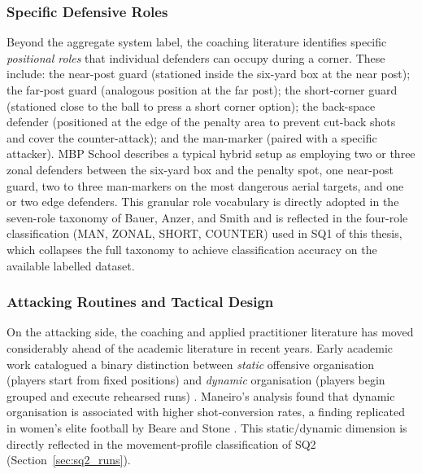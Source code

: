 \subsubsection{Specific Defensive Roles}

Beyond the aggregate system label, the coaching literature identifies specific
\emph{positional roles} that individual defenders can occupy during a corner.
These include: the near-post guard (stationed inside the six-yard box at the
near post); the far-post guard (analogous position at the far post); the
short-corner guard (stationed close to the ball to press a short corner option);
the back-space defender (positioned at the edge of the penalty area to prevent
cut-back shots and cover the counter-attack); and the man-marker (paired with a
specific attacker). MBP School \cite{MBP2025} describes a typical hybrid
setup as employing two or three zonal defenders between the six-yard box and the
penalty spot, one near-post guard, two to three man-markers on the most dangerous
aerial targets, and one or two edge defenders. This granular role vocabulary is
directly adopted in the seven-role taxonomy of Bauer, Anzer, and Smith
\cite{Bauer2022} and is reflected in the four-role classification
(MAN, ZONAL, SHORT, COUNTER) used in SQ1 of this thesis, which collapses the
full taxonomy to achieve classification accuracy on the available labelled
dataset.

\subsubsection{Attacking Routines and Tactical Design}

On the attacking side, the coaching and applied practitioner literature has
moved considerably ahead of the academic literature in recent years. Early
academic work catalogued a binary distinction between \emph{static} offensive
organisation (players start from fixed positions) and \emph{dynamic} organisation
(players begin grouped and execute rehearsed runs) \citep{Maneiro2014}. Maneiro's
analysis found that dynamic organisation is associated with higher shot-conversion
rates, a finding replicated in women's elite football by Beare and Stone
\cite{BeareStone2019}. This static/dynamic dimension is directly reflected
in the movement-profile classification of SQ2 (Section~\ref{sec:sq2_runs}).

